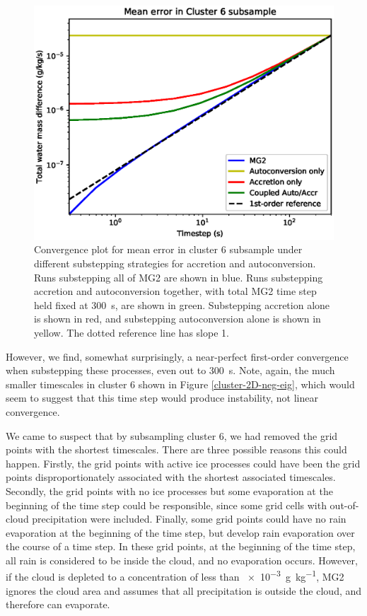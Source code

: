 \documentclass [11pt, proquest] {uwthesis}[2020/02/24]
\begin{document}
\begin{figure}[ht]
  \includegraphics[width=6.5in]{./substep_convergence_mean_c6.eps}
  \caption{Convergence plot for mean error in cluster 6 subsample under different substepping strategies for accretion and autoconversion. Runs substepping all of MG2 are shown in blue. Runs substepping accretion and autoconversion together, with total MG2 time step held fixed at \SI{300}{\second}, are shown in green. Substepping accretion alone is shown in red, and substepping autoconversion alone is shown in yellow. The dotted reference line has slope \num{1}.}
  \label{convergence-accr-auto}
\end{figure}

However, we find, somewhat surprisingly, a near-perfect first-order convergence when substepping these processes, even out to \SI{300}{\second}. Note, again, the much smaller timescales in cluster 6 shown in Figure \ref{cluster-2D-neg-eig}, which would seem to suggest that this time step would produce instability, not linear convergence.

We came to suspect that by subsampling cluster 6, we had removed the grid points with the shortest timescales. There are three possible reasons this could happen. Firstly, the grid points with active ice processes could have been the grid points disproportionately associated with the shortest associated timescales. Secondly, the grid points with no ice processes but some evaporation at the beginning of the time step could be responsible, since some grid cells with out-of-cloud precipitation were included. Finally, some grid points could have no rain evaporation at the beginning of the time step, but develop rain evaporation over the course of a time step. In these grid points, at the beginning of the time step, all rain is considered to be inside the cloud, and no evaporation occurs. However, if the cloud is depleted to a concentration of less than \SI{e-3}{\gram\per\kilo\gram}, MG2 ignores the cloud area and assumes that all precipitation is outside the cloud, and therefore can evaporate.
\end{document}
